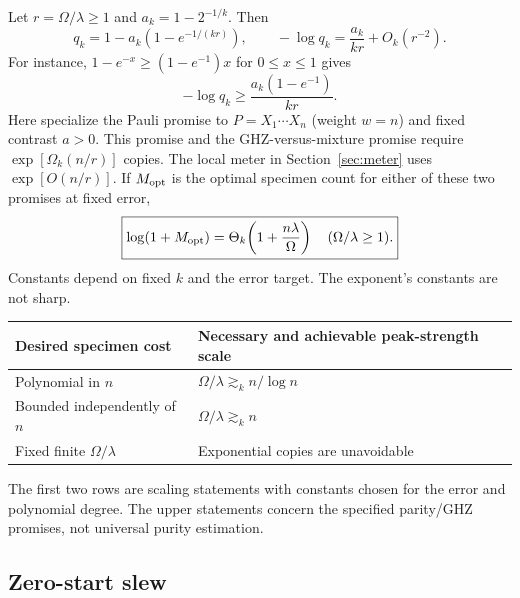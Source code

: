 \documentclass[11pt,a4paper]{article}
\begin{document}
Let $r=\Omega/\lambda\ge1$ and $a_k=1-2^{-1/k}$. Then
\begin{equation}
 q_k=1-a_k(1-e^{-1/(kr)}),\qquad
 -\log q_k=\frac{a_k}{kr}+O_k(r^{-2}).
\end{equation}
For instance, $1-e^{-x}\ge(1-e^{-1})x$ for $0\le x\le1$ gives
\begin{equation}
 -\log q_k\ge\frac{a_k(1-e^{-1})}{kr}.
\end{equation}
Here specialize the Pauli promise to $P=X_1\cdots X_n$ (weight $w=n$) and fixed contrast $a>0$. This promise and the GHZ-versus-mixture promise require $\exp[\Omega_k(n/r)]$ copies. The local meter in Section~\ref{sec:meter} uses $\exp[O(n/r)]$. If $M_{\rm opt}$ is the optimal specimen count for either of these two promises at fixed error,
\begin{equation}
 \boxed{\log(1+M_{\rm opt})=\Theta_k\!\left(1+\frac{n\lambda}{\Omega}\right)
 \quad(\Omega/\lambda\ge1).}
 \label{eq:matched}
\end{equation}
Constants depend on fixed $k$ and the error target. The exponent's constants are not sharp.

\begin{center}
\begin{tabular}{p{67mm}p{77mm}}
\toprule
Desired specimen cost & Necessary and achievable peak-strength scale \\
\midrule
Polynomial in $n$ & $\Omega/\lambda\gtrsim_k n/\log n$ \\
Bounded independently of $n$ & $\Omega/\lambda\gtrsim_k n$ \\
Fixed finite $\Omega/\lambda$ & Exponential copies are unavoidable \\
\bottomrule
\end{tabular}
\end{center}
The first two rows are scaling statements with constants chosen for the error and polynomial degree. The upper statements concern the specified parity/GHZ promises, not universal purity estimation.

\subsection{Zero-start slew}
\end{document}

